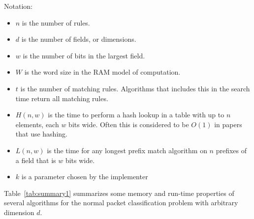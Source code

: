 \documentclass[acmsmall]{acmart}
\begin{document}
Notation:
\begin{itemize}
  \item $n$ is the number of rules.
  \item $d$ is the number of fields, or dimensions.
  \item $w$ is the number of bits in the largest field.
  \item $W$ is the word size in the RAM model of computation.
  \item $t$ is the number of matching rules.  Algorithms that includes this in the search time return all matching rules.
  \item $H(n,w)$ is the time to perform a hash lookup in a table with up to $n$ elements, each $w$ bits wide.  Often this is considered to be $O(1)$ in papers that use hashing.
  \item $L(n,w)$ is the time for any longest prefix match algorithm on $n$ prefixes of a field that is $w$ bits wide.
  \item $k$ is a parameter chosen by the implementer
\end{itemize}

Table~\ref{tab:summary1} summarizes some memory and run-time properties of several algorithms for the normal packet classification problem with arbitrary dimension $d$.
\end{document}
